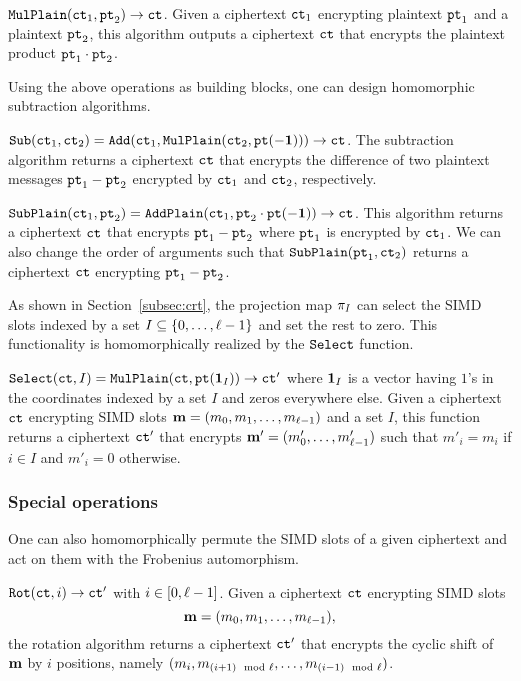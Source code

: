 ${\mathtt{MulPlain}}({\mathtt{ct}}_1, {\mathtt{pt}}_2) \rightarrow {\mathtt{ct}}$. Given a ciphertext ${\mathtt{ct}}_1$ encrypting plaintext ${\mathtt{pt}}_1$ and a plaintext ${\mathtt{pt}}_2$, this algorithm outputs a ciphertext ${\mathtt{ct}}$ that encrypts the plaintext product ${\mathtt{pt}}_1 \cdot {\mathtt{pt}}_2$.

Using the above operations as building blocks, one can design homomorphic subtraction algorithms.

${\mathtt{Sub}}({\mathtt{ct}}_1, {\mathtt{ct}}_2) = {\mathtt{Add}}({\mathtt{ct}}_1, {\mathtt{MulPlain}}({\mathtt{ct}}_2, {\mathtt{pt}}(-\mathbf{1}))) \rightarrow {\mathtt{ct}}$. The subtraction algorithm returns a ciphertext ${\mathtt{ct}}$ that encrypts the difference of two plaintext messages ${\mathtt{pt}}_1 - {\mathtt{pt}}_2$ encrypted by ${\mathtt{ct}}_1$ and ${\mathtt{ct}}_2$, respectively.

${\mathtt{SubPlain}}({\mathtt{ct}}_1, {\mathtt{pt}}_2) = {\mathtt{AddPlain}}({\mathtt{ct}}_1, {\mathtt{pt}}_2 \cdot {\mathtt{pt}}(-\mathbf{1})) \rightarrow {\mathtt{ct}}$. This algorithm returns a ciphertext ${\mathtt{ct}}$ that encrypts ${\mathtt{pt}}_1 - {\mathtt{pt}}_2$ where ${\mathtt{pt}}_1$ is encrypted by ${\mathtt{ct}}_1$.
We can also change the order of arguments such that ${\mathtt{SubPlain}}({\mathtt{pt}}_1, {\mathtt{ct}}_2)$ returns a ciphertext ${\mathtt{ct}}$ encrypting ${\mathtt{pt}}_1 - {\mathtt{pt}}_2$. 

As shown in Section~\ref{subsec:crt}, the projection map $\pi_I$ can select the SIMD slots indexed by a set $I \subseteq \{0,\dots,\ell-1\}$ and set the rest to zero.
This functionality is homomorphically realized by the ${\mathtt{Select}}$ function.

${\mathtt{Select}}({\mathtt{ct}}, I) = {\mathtt{MulPlain}}({\mathtt{ct}}, {\mathtt{pt}}(\mathbf{1}_I)) \rightarrow {\mathtt{ct}}'$ where $\mathbf{1}_I$ is a vector having $1$'s in the coordinates indexed by a set $I$ and zeros everywhere else.
Given a ciphertext ${\mathtt{ct}}$ encrypting SIMD slots $\mathbf{m} = (m_0,m_1,\dots,m_{\ell-1})$ and a set $I$, this function returns a ciphertext ${\mathtt{ct}}'$ that encrypts $\mathbf{m}' = (m'_0,\dots,m'_{\ell-1})$ such that $m'_i = m_i$ if $i \in I$ and $m'_i = 0$ otherwise.

\subsubsection{Special operations}\label{subsec:special_operations}

One can also homomorphically permute the SIMD slots of a given ciphertext and act on them with the Frobenius automorphism. 

${\mathtt{Rot}}({\mathtt{ct}}, i) \rightarrow {\mathtt{ct}}'$ with $i \in [0, \ell-1]$. Given a ciphertext ${\mathtt{ct}}$ encrypting SIMD slots 
$$\mathbf{m} = (m_0,m_1,\dots,m_{\ell-1}),$$
the rotation algorithm returns a ciphertext ${\mathtt{ct}}'$ that encrypts the cyclic shift of $\mathbf{m}$ by $i$ positions, namely $(m_i,m_{(i+1) \mod {\ell}},\dots,m_{(i-1) \mod {\ell}})$.


